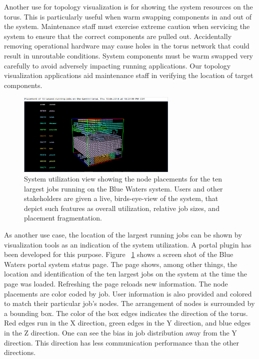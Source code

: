 \documentclass[
    10pt,
    conference,
    compsocconf
]{IEEEtran}
\begin{document}
    Another use for topology visualization is for showing the system resources
    on the torus.  This is particularly useful when warm swapping components in
    and out of the system.  Maintenance staff must exercise extreme caution when
    servicing the system to ensure that the correct components are pulled out.
    Accidentally removing operational hardware may cause holes in the torus
    network that could result in unroutable conditions.  System components must
    be warm swapped very carefully to avoid adversely impacting running
    applications.  Our topology visualization applications aid maintenance staff
    in verifying the location of target components.

\begin{figure}[!t]
	\centering
	\includegraphics[width=3.0in]{capture}
	\caption{
        System utilization view showing the node placements for the ten largest
        jobs running on the Blue Waters system.  Users and other stakeholders
        are given a live, birds-eye-view of the system, that depict such
        features as overall utilization, relative job sizes, and placement
        fragmentation.
    }
	\label{tv1}
\end{figure}

    As another use case, the location of the largest running jobs can be
    shown by visualization tools as an indication of the system utilization. A
    portal plugin has been developed for this purpose. Figure ~\ref{tv1} shows a
    screen shot of the Blue Waters portal system status page. The page shows,
    among other things, the location and identification of the ten largest jobs
    on the system at the time the page was loaded. Refreshing the page reloads
    new information. The node placements are color coded by job. User
    information is also provided and colored to match their particular job's
    nodes. The arrangement of nodes is surrounded by a bounding box. The color
    of the box edges indicates the direction of the torus. Red edges run in the
    X direction, green edges in the Y direction, and blue edges in the Z
    direction. One can see the bias in job distribution away from the Y
    direction. This direction has less communication performance than the other
    directions. 
\end{document}
